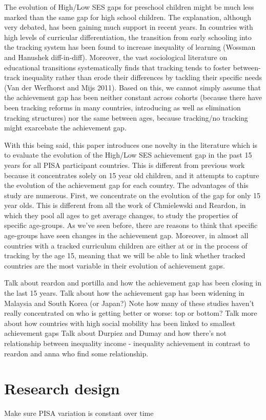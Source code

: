 \documentclass[11pt, a4paper]{article}\usepackage[]{graphicx}\usepackage[]{color}
\begin{document}
The evolution of High/Low SES gaps for preschool children might be much less marked than the same gap for high school children. The explanation, although very debated, has been gaining much support in recent years. In countries with high levels of curricular differentiation, the transition from early schooling into the tracking system has been found to increase inequality of learning (Wossman and Hanushek diff-in-diff). Moreover, the vast sociological literature on educational transitions systematically finds that tracking tends to foster between-track inequality rather than erode their differences by tackling their specific needs (Van der Werfhorst and Mijs 2011). Based on this, we cannot simply assume that the achievement gap has been neither constant across cohorts (because there have been tracking reforms in many countries, introducing as well as elimination tracking structures) nor the same between ages, because tracking/no tracking might exarcebate the achievement gap.

With this being said, this paper introduces one novelty in the literature which is to evaluate the evolution of the High/Low SES achievement gap in the past 15 years for all PISA participant countries. This is different from previous work because it concentrates solely on 15 year old children, and it attempts to capture the evolution of the achievement gap for each country. The advantages of this study are numerous. First, we concentrate on the evolution of the gap for only 15 year olds. This is different from all the work of Chmielewski and Reardon, in which they pool all ages to get average changes, to study the properties of specific age-groups. As we've seen before, there are reasons to think that specific age-groups have seen changes in the achievement gap. Moreover, in almost all countries with a tracked curriculum children are either at or in the process of tracking by the age 15, meaning that we will be able to link whether tracked countries are the most variable in their evolution of achievement gaps.

Talk about reardon and portilla and how the achievement gap has been closing in the last 15 years.
Talk about how the achievement gap has been widening in Malaysia and South Korea (or Japan?)
Note how many of these studies haven't really concentrated on who is getting better or worse: top or bottom?
Talk more about how countries with high social mobility has been linked to smallest achievement gaps
Talk about Durpiez and Dumay and how there's not relationship between inequality income - inequality achievement in contrast to reardon and anna who find some relationship.

\section{Research design}

Make sure PISA variation is constant over time
\end{document}
